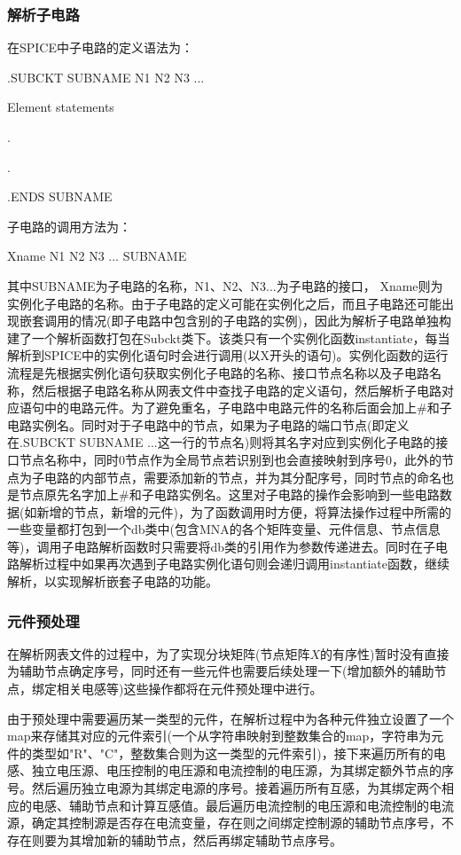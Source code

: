 \documentclass[12pt]{article}
\begin{document}
\subsubsection{解析子电路}
\qquad 在SPICE中子电路的定义语法为：\par
\qquad .SUBCKT \quad SUBNAME \quad N1 \quad N2 \quad N3 \quad ... \par
\qquad Element \quad statements\par
\qquad .\par
\qquad .\par
\qquad .ENDS \quad SUBNAME\par
\qquad 子电路的调用方法为：\par
\qquad Xname \quad N1 \quad N2 \quad N3 \quad ... \quad SUBNAME\par
\qquad 其中SUBNAME为子电路的名称，N1、N2、N3...为子电路的接口， Xname则为实例化子电路的名称。由于子电路的定义可能在实例化之后，而且子电路还可能出现嵌套调用的情况(即子电路中包含别的子电路的实例)，因此为解析子电路单独构建了一个解析函数打包在Subckt类下。该类只有一个实例化函数instantiate，每当解析到SPICE中的实例化语句时会进行调用(以X开头的语句)。实例化函数的运行流程是先根据实例化语句获取实例化子电路的名称、接口节点名称以及子电路名称，然后根据子电路名称从网表文件中查找子电路的定义语句，然后解析子电路对应语句中的电路元件。为了避免重名，子电路中电路元件的名称后面会加上\#和子电路实例名。同时对于子电路中的节点，如果为子电路的端口节点(即定义在.SUBCKT SUBNAME ...这一行的节点名)则将其名字对应到实例化子电路的接口节点名称中，同时0节点作为全局节点若识别到也会直接映射到序号0，此外的节点为子电路的内部节点，需要添加新的节点，并为其分配序号，同时节点的命名也是节点原先名字加上\#和子电路实例名。这里对子电路的操作会影响到一些电路数据(如新增的节点，新增的元件)，为了函数调用时方便，将算法操作过程中所需的一些变量都打包到一个db类中(包含MNA的各个矩阵变量、元件信息、节点信息等)，调用子电路解析函数时只需要将db类的引用作为参数传递进去。同时在子电路解析过程中如果再次遇到子电路实例化语句则会递归调用instantiate函数，继续解析，以实现解析嵌套子电路的功能。\par

\subsubsection{元件预处理}
\qquad 在解析网表文件的过程中，为了实现分块矩阵(节点矩阵$X$的有序性)暂时没有直接为辅助节点确定序号，同时还有一些元件也需要后续处理一下(增加额外的辅助节点，绑定相关电感等)这些操作都将在元件预处理中进行。\par
\qquad 由于预处理中需要遍历某一类型的元件，在解析过程中为各种元件独立设置了一个map来存储其对应的元件索引(一个从字符串映射到整数集合的map，字符串为元件的类型如"R"、"C"，整数集合则为这一类型的元件索引)，接下来遍历所有的电感、独立电压源、电压控制的电压源和电流控制的电压源，为其绑定额外节点的序号。然后遍历独立电源为其绑定电源的序号。接着遍历所有互感，为其绑定两个相应的电感、辅助节点和计算互感值。最后遍历电流控制的电压源和电流控制的电流源，确定其控制源是否存在电流变量，存在则之间绑定控制源的辅助节点序号，不存在则要为其增加新的辅助节点，然后再绑定辅助节点序号。\par
\end{document}
